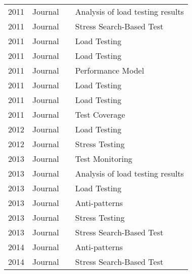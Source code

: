 \begin{longtable}{llll}
2011          & Journal          & \cite{Babbar2011}               & Analysis of load testing results \\
2011          & Journal          & \cite{Baars2011}                & Stress Search-Based Test         \\
2011          & Journal          & \cite{Barna2011}                & Load Testing                     \\
2011          & Journal          & \cite{Nguyen2011}               & Load Testing                     \\
2011          & Journal          & \cite{Shoaib2011}               & Performance Model                \\
2011          & Journal          & \cite{Santos2011}               & Load Testing                     \\
2011          & Journal          & \cite{Zhang2011}                & Load Testing                     \\
2011          & Journal          & \cite{Catelani2011}             & Test Coverage                    \\
2012          & Journal          & \cite{Yan2012}                  & Load Testing                     \\
2012          & Journal          & \cite{Grechanik2012}            & Stress Testing                   \\
2013          & Journal          & \cite{Vasar2012}                & Test Monitoring                  \\
2013          & Journal          & \cite{Malik2013a}               & Analysis of load testing results \\
2013          & Journal          & \cite{Wang2013}                 & Load Testing                     \\
2013          & Journal          & \cite{Wert2013a}                & Anti-patterns                    \\
2013          & Journal          & \cite{Barna2013}                & Stress Testing                   \\
2013          & Journal          & \cite{DiAlesio2013}             & Stress Search-Based Test         \\
2014          & Journal          & \cite{Wert2014}                 & Anti-patterns                    \\
2014          & Journal          & \cite{DiAlesio2014}             & Stress Search-Based Test         \\

\end{longtable}
